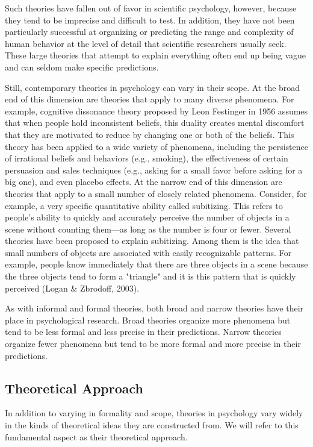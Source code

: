 Such theories have fallen out of favor in scientific psychology, however, because they tend to be imprecise and difficult to test. In addition, they have not been particularly successful at organizing or predicting the range and complexity of human behavior at the level of detail that scientific researchers usually seek. These large theories that attempt to explain everything often end up being vague and can seldom make specific predictions.

Still, contemporary theories in psychology can vary in their scope. At the broad end of this dimension are theories that apply to many diverse phenomena. For example, cognitive dissonance theory proposed by Leon Festinger in 1956 assumes that when people hold inconsistent beliefs, this duality creates mental discomfort that they are motivated to reduce by changing one or both of the beliefs. This theory has been applied to a wide variety of phenomena, including the persistence of irrational beliefs and behaviors (e.g., smoking), the effectiveness of certain persuasion and sales techniques (e.g., asking for a small favor before asking for a big one), and even placebo effects. At the narrow end of this dimension are theories that apply to a small number of closely related phenomena. Consider, for example, a very specific quantitative ability called subitizing. This refers to people's ability to quickly and accurately perceive the number of objects in a scene without counting them---as long as the number is four or fewer. Several theories have been proposed to explain subitizing. Among them is the idea that small numbers of objects are associated with easily recognizable patterns. For example, people know immediately that there are three objects in a scene because the three objects tend to form a "triangle" and it is this pattern that is quickly perceived (Logan \& Zbrodoff, 2003).

As with informal and formal theories, both broad and narrow theories have their place in psychological research. Broad theories organize more phenomena but tend to be less formal and less precise in their predictions. Narrow theories organize fewer phenomena but tend to be more formal and more precise in their predictions.

\subsection{Theoretical Approach}

In addition to varying in formality and scope, theories in psychology vary widely in the kinds of theoretical ideas they are constructed from. We will refer to this fundamental aspect as their theoretical approach.

